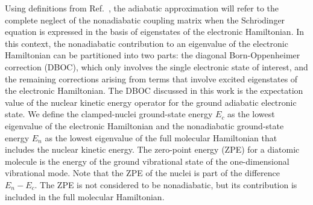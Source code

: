 Using definitions from Ref.~\cite{Cederbaum_Review}, the adiabatic approximation will refer to the complete neglect of the nonadiabatic coupling matrix when the Schr$\ddot{\text{o}}$dinger equation is expressed in the basis of eigenstates of the electronic Hamiltonian. In this context, the nonadiabatic contribution to an eigenvalue of the electronic Hamiltonian can be partitioned into two parts: the diagonal Born-Oppenheimer correction (DBOC), which only involves the single electronic state of interest, and the remaining corrections arising from terms that involve excited eigenstates of the electronic Hamiltonian. The DBOC discussed in this work is the expectation value of the nuclear kinetic energy operator for the ground adiabatic electronic state. We define the clamped-nuclei ground-state energy $E_c$ as the lowest eigenvalue of the electronic Hamiltonian and the nonadiabatic ground-state energy $E_n$ as the lowest eigenvalue of the full molecular Hamiltonian that includes the nuclear kinetic energy. The zero-point energy (ZPE) for a diatomic molecule is the energy of the ground vibrational state of the one-dimensional vibrational mode. Note that the ZPE of the nuclei is part of the difference $E_n-E_c$. The ZPE is not considered to be nonadiabatic, but its contribution is included in the full molecular Hamiltonian.

